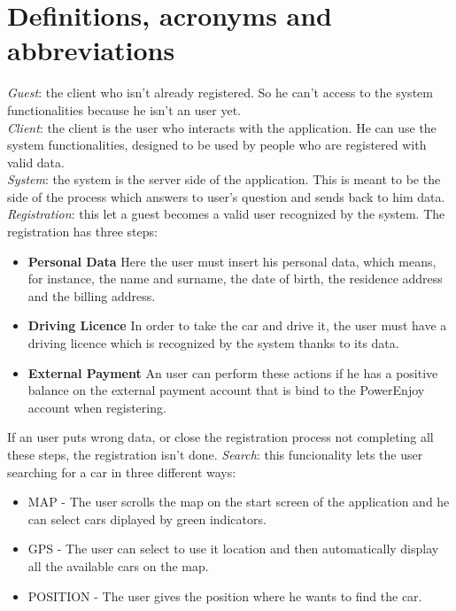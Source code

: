 \documentclass[11pt,a4paper]{report}
\begin{document}
\section{Definitions, acronyms and abbreviations}
\textit{Guest}: the client who isn't already registered. So he can't access to the system functionalities because he isn't an user yet.\\
\textit{Client}: the client is the user who interacts with the application. He can use the system functionalities, designed to be used by people who are registered with valid data.\\
\textit{System}: the system is the server side of the application. This is meant to be the side of the process which answers to user's question and sends back to him data.\\
\textit{Registration}: this let a guest becomes a valid user recognized by the system. The registration has three steps:
	\begin{itemize}
		\item \textbf{Personal Data} Here the user must insert his personal data, which means, for instance, the name and surname, the date of birth, the residence address and the billing address.\\
		\item \textbf{Driving Licence} In order to take the car and drive it, the user must have a driving licence which is recognized by the system thanks to its data.\\
		\item \textbf{External Payment} An user can perform these actions if he has a positive balance on the external payment account that is bind to the PowerEnjoy account when registering.\\
	\end{itemize}	
If an user puts wrong data, or close the registration process not completing all these steps, the registration isn't done.
\textit{Search}: this funcionality lets the user searching for a car in three different ways:
	\begin{itemize}
		\item MAP - The user scrolls the map on the start screen of the application and he can select cars diplayed by green indicators.
		\item GPS - The user can select to use it location and then automatically display all the available cars on the map.
		\item POSITION - The user gives the position where he wants to find the car.
	\end{itemize}
\end{document}
